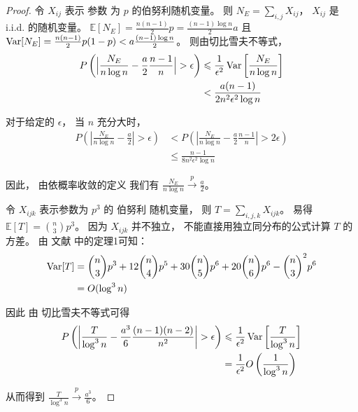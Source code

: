 \begin{proof}
		令 $X_{ij}$ 表示
    参数 为 $p$ 的伯努利随机变量。
     则 $N_E
    = \sum_{i,j} X_{ij}$， $X_{ij}$ 是 i.i.d.
    的随机变量。
	$\mathbb{E}[N_E] = \frac{n(n-1)}{2}p = \frac{(n-1)\log n}{2}a$ 
  且  $\operatorname{\mathrm{Var}}[N_E] = \frac{n(n-1)}{2} p(1-p) < a\frac{(n-1)\log n}{2}$。
	则由切比雪夫不等式，
	\begin{align*}
	P\left(\Big|\frac{N_E}{n \log n } - \frac{a}{2} \frac{n-1}{n}\Big| > \epsilon \right) & \leqslant
	\frac{1}{\epsilon^2}\operatorname{\mathrm{Var}} \left[\frac{N_E } {n \log n } \right] \\
	& < \frac{a(n-1)}{2n^2\epsilon^2\log n}
	\end{align*}
	
	对于给定的 $\epsilon$， 当 $n$ 充分大时，
  \begin{align*}
	P \left(\left|\frac{N_E}{n \log n } - \frac{a}{2} \right| > \epsilon \right) & <
	P \left(\left|\frac{N_E}{n \log n } - \frac{a}{2} \frac{n-1}{n}\right| > 2\epsilon \right) \\
	& \leq \frac{n-1}{8n^2 \epsilon^2 \log n}
	\end{align*}
	
	因此， 由依概率收敛的定义
  我们有 $\frac{N_E}{n \log n} \xrightarrow{p} \frac{a}{2}$。
	
	令 $X_{ijk}$ 表示参数为  $p^3$ 的 伯努利 随机变量，
	则 $T = \sum_{i,j,k} X_{ijk}$。
	易得 $\mathbb{E}[T] = \binom{n}{3}p^3$。
  因为 $X_{ijk}$ 并不独立，
  不能直接用独立同分布的公式计算 $T$ 的方差。
	由 文献  中的定理1可知：
	\begin{align*}
	\operatorname{\mathrm{Var}}[T]  &= \binom{n}{3} p^3 + 12 \binom{n}{4} p^5 + 30 \binom{n}{5} p^6 + 20 \binom{n}{6} p^6
	 - \binom{n}{3}^2 p^6  \\ 
   &= O(\log^3 n)
	\end{align*}
	
	因此
	由 切比雪夫不等式可得
	\begin{align*}
	P \left (\left|\frac{T}{\log^3 n } - \frac{a^3}{6} \frac{(n-1)(n-2)}{n^2}\right| > \epsilon \right)
   &\leqslant \frac{1}{\epsilon^2} \operatorname{\mathrm{Var}} \left[ \frac{T}{\log^3 n} \right]\\ 
	& = \frac{1}{\epsilon^2}O \left(\frac{1}{\log^3 n} \right)
	\end{align*}
	    
	从而得到 $\frac{T}{\log^3 n} \xrightarrow{p} \frac{a^3}{6}$。
\end{proof}
